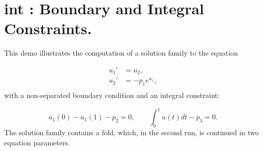 \documentclass[12pt]{report}
\begin{document}
\newpage
\section{ int : Boundary and Integral Constraints.} \label{sec:Demos_int}
This demo illustrates the computation of a solution family to
the equation

\begin{equation} \begin{array}{cl}
 u_1 ' &= u_2 , \\
  u_2 ' &= -p_1  e^{u_1} , \\\end{array} \end{equation}
with a non-separated boundary condition and an integral constraint:

$$ u_1(0)-u_1(1)-p_2=0 ,\qquad \int_0^{1}u(t)dt-p_3=0 . $$
The solution family contains a fold, which, in the second run, is  
continued in two equation parameters.
\end{document}
